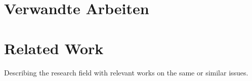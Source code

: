 {\chapter{Verwandte Arbeiten}}
{\chapter{Related Work}}
\label{sec:related}

Describing the research field with relevant works on the same or similar issues.

